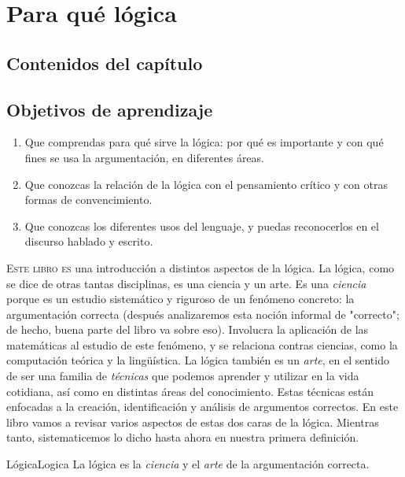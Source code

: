 \renewcommand\chapterillustration{wall/wall5}	%
\chapter{Para qué lógica}
\begin{inicio}{}{}%
	\section*{Contenidos del capítulo}	
	\startcontents[chapters]
	\bigskip \bigskip
	\section*{Objetivos de aprendizaje}	
	\begin{enumerate}
	\item Que comprendas para qué sirve la lógica: por qué es importante y con qué fines se usa la argumentación, en diferentes áreas.
	\item Que conozcas la relación de la lógica con el pensamiento crítico y con otras formas de convencimiento.
	\item Que conozcas los diferentes usos del lenguaje, y puedas reconocerlos en el discurso hablado y escrito.
	\end{enumerate}
\end{inicio}\clearpage


\noindent \lettrine[lines=3]{E}{ste libro es} una introducción a distintos aspectos de la lógica. La lógica, como se dice de otras tantas disciplinas, es una ciencia y un arte. Es una \textit{ciencia} porque es un estudio sistemático y riguroso de un fenómeno concreto: la argumentación correcta (después analizaremos esta noción informal de "correcto"; de hecho, buena parte del libro va sobre eso). Involucra la aplicación de las matemáticas al estudio de este fenómeno, y se relaciona contras ciencias, como la computación teórica y la lingüística. La lógica también es un \textit{arte}, en el sentido de ser una familia de \textit{técnicas} que podemos aprender y utilizar en la vida cotidiana, así como en distintas áreas del conocimiento. Estas técnicas están enfocadas a la creación, identificación y análisis de argumentos correctos. En este libro vamos a revisar varios aspectos de estas dos caras de la lógica. Mientras tanto, sistematicemos lo dicho hasta ahora en nuestra primera definición.


\begin{definition}{Lógica}{Logica}
	La lógica es la \textit{ciencia} y el \textit{arte} de la argumentación correcta. 
\end{definition}





